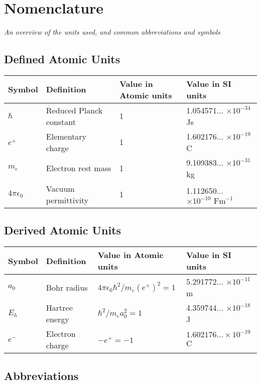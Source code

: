\chapter*{Nomenclature}

\emph{An overview of the units used, and common abbreviations and symbols}

\section*{Defined Atomic Units}

\begin{longtable}{p{2.5cm}p{4cm}p{4cm}p{4cm}}
    \toprule
    Symbol & Definition & Value in Atomic units & Value in SI units \\
    \midrule\endhead
    $\hbar$ & Reduced Planck constant & 1 & 1.054571... $\times 10^{-34}$ Js \\
    $e^+$ & Elementary charge & 1 & 1.602176... $\times 10^{-19}$ C \\
    $m_e$ & Electron rest mass & 1 & 9.109383... $\times 10^{-31}$ kg \\
    $ 4 \pi \epsilon_0$ & Vacuum permittivity & 1 & 1.112650... $\times 10^{-10} \text{ Fm}^{-1}$ 

\end{longtable}

\section*{Derived Atomic Units}

\begin{longtable}{p{2.5cm}p{4cm}p{4cm}p{4cm}}
    \toprule
    Symbol & Definition & Value in Atomic units & Value in SI units \\
    \midrule\endhead
    $a_0$ & Bohr radius & $4 \pi \epsilon_0 \hbar^2 / m_e (e^+)^2 = 1$ & 5.291772... $\times 10^{-11}$ m \\
    $E_h$ & Hartree energy & $\hbar^2 / m_e a_0^2 = 1$ & 4.359744... $\times 10^{-18}$ J \\
    $e^-$ & Electron charge & $-e^+ = -1$ & $1.602176... \times 10^{-19} $ C \\

\end{longtable}

\section*{Abbreviations}

